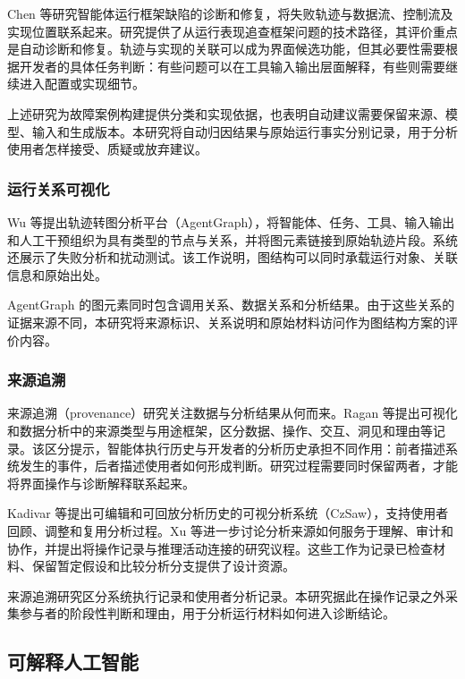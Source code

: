 Chen 等\cite{ref20}研究智能体运行框架缺陷的诊断和修复，将失败轨迹与数据流、控制流及实现位置联系起来。研究提供了从运行表现追查框架问题的技术路径，其评价重点是自动诊断和修复。轨迹与实现的关联可以成为界面候选功能，但其必要性需要根据开发者的具体任务判断：有些问题可以在工具输入输出层面解释，有些则需要继续进入配置或实现细节。

上述研究为故障案例构建提供分类和实现依据，也表明自动建议需要保留来源、模型、输入和生成版本。本研究将自动归因结果与原始运行事实分别记录，用于分析使用者怎样接受、质疑或放弃建议。

\subsubsection{运行关系可视化}

Wu 等\cite{ref23}提出轨迹转图分析平台（AgentGraph），将智能体、任务、工具、输入输出和人工干预组织为具有类型的节点与关系，并将图元素链接到原始轨迹片段。系统还展示了失败分析和扰动测试。该工作说明，图结构可以同时承载运行对象、关联信息和原始出处。

AgentGraph 的图元素同时包含调用关系、数据关系和分析结果。由于这些关系的证据来源不同，本研究将来源标识、关系说明和原始材料访问作为图结构方案的评价内容。

\subsubsection{来源追溯}

来源追溯（provenance）研究关注数据与分析结果从何而来。Ragan 等\cite{ref36}提出可视化和数据分析中的来源类型与用途框架，区分数据、操作、交互、洞见和理由等记录。该区分提示，智能体执行历史与开发者的分析历史承担不同作用：前者描述系统发生的事件，后者描述使用者如何形成判断。研究过程需要同时保留两者，才能将界面操作与诊断解释联系起来。

Kadivar 等\cite{ref38}提出可编辑和可回放分析历史的可视分析系统（CzSaw），支持使用者回顾、调整和复用分析过程。Xu 等\cite{ref37}进一步讨论分析来源如何服务于理解、审计和协作，并提出将操作记录与推理活动连接的研究议程。这些工作为记录已检查材料、保留暂定假设和比较分析分支提供了设计资源。

来源追溯研究区分系统执行记录和使用者分析记录。本研究据此在操作记录之外采集参与者的阶段性判断和理由，用于分析运行材料如何进入诊断结论。

\subsection{可解释人工智能}

